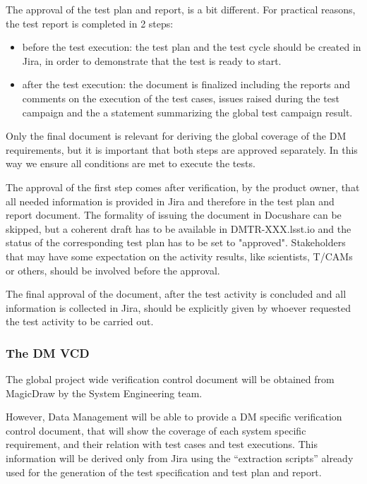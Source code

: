 The approval of the test plan and report, is a bit different.
For practical reasons, the test report is completed in 2 steps:

\begin{itemize}
\item before the test execution: the test plan and the test cycle should be created in Jira, in order to demonstrate that the test is ready to start.
\item after the test execution: the document is finalized including the reports and comments on the execution of the test cases, issues raised during the test campaign and the a statement summarizing the global test campaign result.
\end{itemize}

Only the final document is relevant for deriving the global coverage of the DM requirements, but it is important that both steps are approved separately. In this way we ensure all conditions are met to  execute the tests.

The approval of the first step comes after verification,  by the product owner, that all needed information is provided in Jira and therefore in the test plan and report document.
The formality of  issuing  the document in Docushare can be skipped, but a coherent draft has to be available in DMTR-XXX.lsst.io and the status of the corresponding test plan has to be set to "approved".
Stakeholders that may have some expectation on the activity results, like scientists, T/CAMs or others, should  be involved before the approval.

The final approval of the document, after the test activity is concluded and all information is collected in Jira, should be explicitly given by whoever requested the test activity to be carried out.

\subsubsection{The DM VCD}

The global project wide verification control document will be obtained from MagicDraw by the System Engineering team.

However, Data Management will be able to provide a DM specific verification control document, that will show the coverage of each system specific requirement, and their relation with test cases and test executions.
This information will be derived only from Jira using the ``extraction scripts'' already used for the generation of the test specification and test plan and report.

